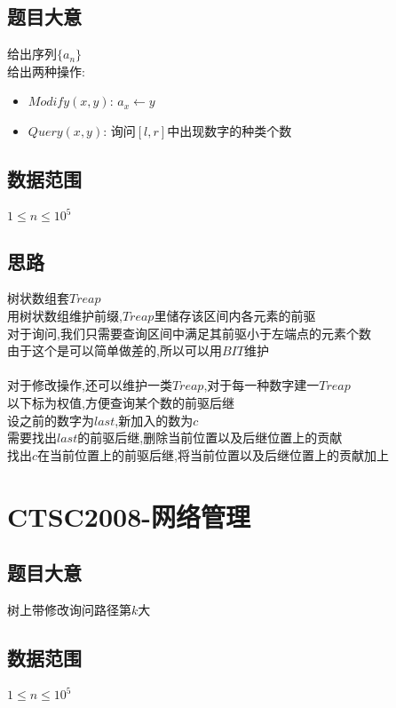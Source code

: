 \documentclass{ctexart}
\numberwithin{equation}{section}
\begin{document}
\begin{flushleft}
  \subsection{题目大意}
  给出序列$\{a_n\}$\\
  给出两种操作:\\
  \begin{itemize}
  \item $Modify(x,y)$: $a_x \leftarrow y$
  \item $Query(x,y)$: 询问$[l,r]$中出现数字的种类个数
  \end{itemize}
  \subsection{数据范围}
  $1\le n\le 10^5$\\
  \subsection{思路}
  树状数组套$Treap$\\
  用树状数组维护前缀,$Treap$里储存该区间内各元素的前驱\\
  对于询问,我们只需要查询区间中满足其前驱小于左端点的元素个数\\
  由于这个是可以简单做差的,所以可以用$BIT$维护\\
  ~\\
  对于修改操作,还可以维护一类$Treap$,对于每一种数字建一$Treap$\\
  以下标为权值,方便查询某个数的前驱后继\\
  设之前的数字为$last$,新加入的数为$c$\\
  需要找出$last$的前驱后继,删除当前位置以及后继位置上的贡献\\
  找出$c$在当前位置上的前驱后继,将当前位置以及后继位置上的贡献加上\\
  \newpage

  \section{CTSC2008-网络管理}
  \subsection{题目大意}
  树上带修改询问路径第$k$大\\
  \subsection{数据范围}
  $1\le n\le 10^5$\\

\end{flushleft}
\end{document}
